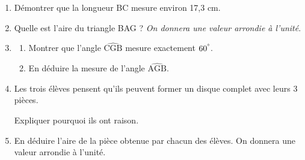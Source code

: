 \documentclass[exercice,a4]{thedocument}%
\begin{document}
\begin{enumerate}
\item Démontrer que la longueur BC mesure environ 17,3 cm.
\item Quelle est l'aire du triangle BAG ? \emph{On donnera une valeur arrondie à l'unité}.
\item 
	\begin{enumerate}
		\item Montrer que l'angle $\widehat{\text{CGB}}$ mesure exactement $60\textsuperscript{\textdegree}$.
		\item En déduire la mesure de l'angle $\widehat{\text{AGB}}$.
	\end{enumerate}
\item Les trois élèves pensent qu'ils peuvent former un disque complet avec leurs 3 pièces.

Expliquer pourquoi ils ont raison.
\item En déduire l'aire de la pièce obtenue par chacun des élèves. On donnera une valeur arrondie à l'unité.
\end{enumerate}
\showthesource
\end{document}

